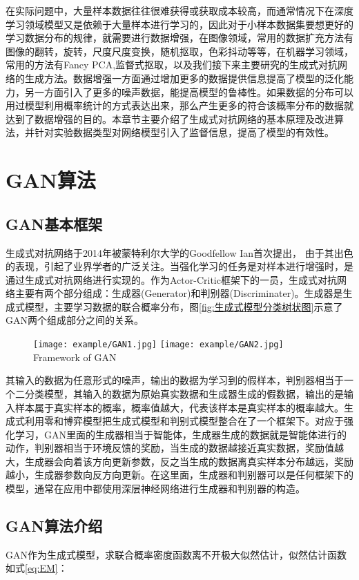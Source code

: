 在实际问题中，大量样本数据往往很难获得或获取成本较高，而通常情况下在深度学习领域模型又是依赖于大量样本进行学习的，因此对于小样本数据集要想更好的学习数据分布的规律，就需要进行数据增强，在图像领域，常用的数据扩充方法有图像的翻转，旋转，尺度尺度变换，随机抠取，色彩抖动等等，在机器学习领域，常用的方法有Fancy PCA\cite{Holdt2010Genome},监督式抠取，以及我们接下来主要研究的生成式对抗网络的生成方法。数据增强一方面通过增加更多的数据提供信息提高了模型的泛化能力，另一方面引入了更多的噪声数据，能提高模型的鲁棒性。如果数据的分布可以用过模型利用概率统计的方式表达出来，那么产生更多的符合该概率分布的数据就达到了数据增强的目的。本章节主要介绍了生成式对抗网络的基本原理及改进算法，并针对实验数据类型对网络模型引入了监督信息，提高了模型的有效性。
\section{GAN算法}
\subsection{GAN基本框架}
生成式对抗网络于2014年被蒙特利尔大学的Goodfellow Ian首次提出， 由于其出色的表现，引起了业界学者的广泛关注。当强化学习的任务是对样本进行增强时，是通过生成式对抗网络进行实现的。作为Actor-Critic框架下的一员，生成式对抗网络主要有两个部分组成：生成器(Generator)和判别器(Discriminater)。生成器是生成式模型，主要学习数据的联合概率分布，图\ref{fig:生成式模型分类树状图}示意了GAN两个组成部分之间的关系。

\begin{figure}[!htp]
	\centering
	\texttt{[image: example/GAN1.jpg]}
	\hspace{1cm}
	\texttt{[image: example/GAN2.jpg]}
	{Framework of GAN}
	\label{fig:GAN1}
\end{figure}
其输入的数据为任意形式的噪声，输出的数据为学习到的假样本，判别器相当于一个二分类模型，其输入的数据为原始真实数据和生成器生成的假数据，输出的是输入样本属于真实样本的概率，概率值越大，代表该样本是真实样本的概率越大。生成式利用零和博弈模型把生成式模型和判别式模型整合在了一个框架下。对应于强化学习，GAN里面的生成器相当于智能体，生成器生成的数据就是智能体进行的动作，判别器相当于环境反馈的奖励，当生成的数据越接近真实数据，奖励值越大，生成器会向着该方向更新参数，反之当生成的数据离真实样本分布越远，奖励越小，生成器参数向反方向更新。在这里面，生成器和判别器可以是任何框架下的模型，通常在应用中都使用深层神经网络进行生成器和判别器的构造。

\subsection{GAN算法介绍}
GAN作为生成式模型，求联合概率密度函数离不开极大似然估计，似然估计函数如式\ref{eq:EM}：

